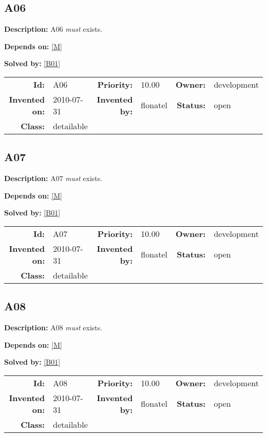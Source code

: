 \subsection{A06}\label{A06}
\textbf{Description:} A06 \textsl{must} exists.

\textbf{Depends on:} \ref{M} 

\textbf{Solved by:} \ref{B01} 

\par
{\small \begin{center}\begin{tabular}{rlrlrl}
\textbf{Id:} & A06  & \textbf{Priority:} & 10.00  & \textbf{Owner:} & development\\ 
\textbf{Invented on:} & 2010-07-31  & \textbf{Invented by:} & flonatel  & \textbf{Status:} & open \\ 
\textbf{Class:} & detailable  & & & \end{tabular}\end{center} }
\subsection{A07}\label{A07}
\textbf{Description:} A07 \textsl{must} exists.

\textbf{Depends on:} \ref{M} 

\textbf{Solved by:} \ref{B01} 

\par
{\small \begin{center}\begin{tabular}{rlrlrl}
\textbf{Id:} & A07  & \textbf{Priority:} & 10.00  & \textbf{Owner:} & development\\ 
\textbf{Invented on:} & 2010-07-31  & \textbf{Invented by:} & flonatel  & \textbf{Status:} & open \\ 
\textbf{Class:} & detailable  & & & \end{tabular}\end{center} }
\subsection{A08}\label{A08}
\textbf{Description:} A08 \textsl{must} exists.

\textbf{Depends on:} \ref{M} 

\textbf{Solved by:} \ref{B01} 

\par
{\small \begin{center}\begin{tabular}{rlrlrl}
\textbf{Id:} & A08  & \textbf{Priority:} & 10.00  & \textbf{Owner:} & development\\ 
\textbf{Invented on:} & 2010-07-31  & \textbf{Invented by:} & flonatel  & \textbf{Status:} & open \\ 
\textbf{Class:} & detailable  & & & \end{tabular}\end{center} }
